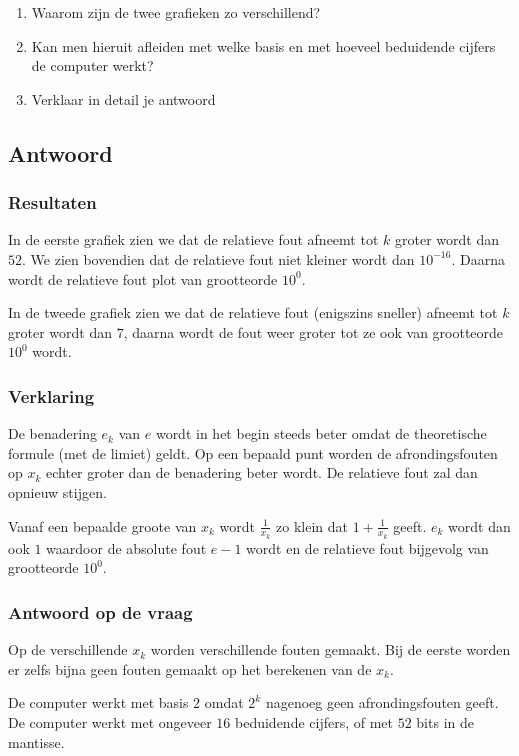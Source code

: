 \documentclass[examenvragen.tex]{subfiles}
\begin{document}
\begin{enumerate}
\item Waarom zijn de twee grafieken zo verschillend?
\item Kan men hieruit afleiden met welke basis en met hoeveel beduidende cijfers de computer werkt?
\item Verklaar in detail je antwoord
\end{enumerate}

\subsection{Antwoord}
\subsubsection{Resultaten}
In de eerste grafiek zien we dat de relatieve fout afneemt tot $k$ groter wordt dan $52$. We zien bovendien dat de relatieve fout niet kleiner wordt dan $10^{-16}$. Daarna wordt de relatieve fout plot van grootteorde $10^{0}$.

In de tweede grafiek zien we dat de relatieve fout (enigszins sneller) afneemt tot $k$ groter wordt dan $7$, daarna wordt de fout weer groter tot ze ook van grootteorde $10^{0}$ wordt.

\subsubsection{Verklaring}
De benadering $e_k$ van $e$ wordt in het begin steeds beter omdat de theoretische formule (met de limiet) geldt. Op een bepaald punt worden de afrondingsfouten op $x_k$ echter groter dan de benadering beter wordt. De relatieve fout zal dan opnieuw stijgen.

Vanaf een bepaalde groote van $x_k$ wordt $\frac{1}{x_k}$ zo klein dat $1 + \frac{1}{x_k}$ geeft. $e_k$ wordt dan ook $1$ waardoor de absolute fout $e - 1$ wordt en de relatieve fout bijgevolg van grootteorde $10^{0}$.

\subsubsection{Antwoord op de vraag}
Op de verschillende $x_k$ worden verschillende fouten gemaakt. Bij de eerste worden er zelfs bijna geen fouten gemaakt op het berekenen van de $x_k$.

De computer werkt met basis $2$ omdat $2^k$ nagenoeg geen afrondingsfouten geeft. De computer werkt met ongeveer $16$ beduidende cijfers, of met $52$ bits in de mantisse.
\end{document}
